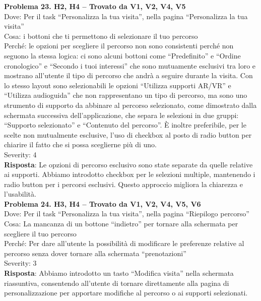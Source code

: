 \documentclass{article}
\begin{document}
\noindent \textbf{Problema 23. H2, H4 – Trovato da V1, V2, V4, V5} \\
Dove: Per il task “Personalizza la tua visita”, nella pagina “Personalizza la tua visita” \\
Cosa: i bottoni che ti permettono di selezionare il tuo percorso \\
Perché: le opzioni per scegliere il percorso non sono consistenti perché non seguono la stessa logica: ci sono alcuni bottoni come “Predefinito” e “Ordine cronologico” e “Secondo i tuoi interessi” che sono mutuamente esclusivi tra loro e mostrano all’utente il tipo di percorso che andrà a seguire durante la visita. Con lo stesso layout sono selezionabili le opzioni “Utilizza supporti AR/VR” e “Utilizza audioguida” che non rappresentano un tipo di percorso, ma sono uno strumento di supporto da abbinare al percorso selezionato, come dimostrato dalla schermata successiva dell’applicazione, che separa le selezioni in due gruppi: “Supporto selezionato” e “Contenuto del percorso”. È inoltre preferibile, per le scelte non mutualmente esclusive, l’uso di checkbox al posto di radio button per chiarire il fatto che si possa sceglierne più di uno. \\
Severity: 4 \\
\textbf{Risposta}: Le opzioni di percorso esclusivo sono state separate da quelle relative ai supporti. Abbiamo introdotto checkbox per le selezioni multiple, mantenendo i radio button per i percorsi esclusivi. Questo approccio migliora la chiarezza e l’usabilità.\\

\noindent \textbf{Problema 24. H3, H4 – Trovato da V1, V2, V4, V5, V6} \\
Dove: Per il task “Personalizza la tua visita”, nella pagina “Riepilogo percorso” \\
Cosa: La mancanza di un bottone “indietro” per tornare alla schermata per scegliere il tuo percorso \\
Perché: Per dare all’utente la possibilità di modificare le preferenze relative al percorso senza dover tornare alla schermata “prenotazioni” \\
Severity: 3 \\
\textbf{Risposta}: Abbiamo introdotto un tasto “Modifica visita” nella schermata riassuntiva, consentendo all’utente di tornare direttamente alla pagina di personalizzazione per apportare modifiche al percorso o ai supporti selezionati.\\
\end{document}
